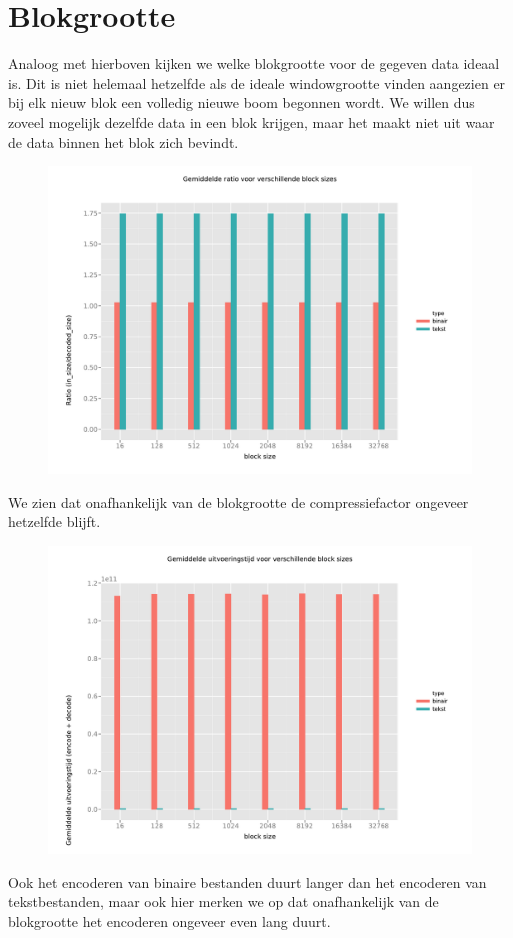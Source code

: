 \documentclass[a4paper,12pt]{report}
\begin{document}
\section{Blokgrootte}
Analoog met hierboven kijken we welke blokgrootte voor de gegeven data ideaal is. Dit is niet helemaal hetzelfde als de ideale windowgrootte vinden aangezien er bij elk nieuw blok een volledig nieuwe boom begonnen wordt. We willen dus zoveel mogelijk dezelfde data in een blok krijgen, maar het maakt niet uit waar de data binnen het blok zich bevindt. \\
\begin{figure}[H]
	\includegraphics[scale=0.6]{../experimenten/block_avg_ratio}
\end{figure}
We zien dat onafhankelijk van de blokgrootte de compressiefactor ongeveer hetzelfde blijft.  
\begin{figure}[H]
	\includegraphics[scale=0.6]{../experimenten/block_avg_time}
\end{figure} 
Ook het encoderen van binaire bestanden duurt langer dan het encoderen van tekstbestanden, maar ook hier merken we op dat onafhankelijk van de blokgrootte het encoderen ongeveer even lang duurt.
\end{document}
